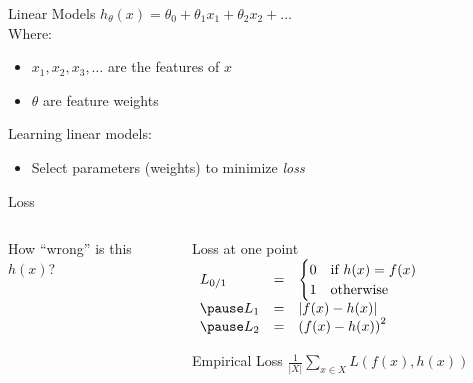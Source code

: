 \documentclass[14pt]{beamer}
\begin{document}
\begin{frame}[label=linear-models]{Linear Models}{}
{\Large$h_{\theta}(x) = \theta_0 + \theta_1 x_1 + \theta_2 x_2 + \ldots$}\\[1em]
Where:
\begin{itemize}
\item $x_1, x_2, x_3, \ldots$ are the features of $x$
\item $\theta$ are feature weights
\end{itemize}
\pause
\bigskip
Learning linear models:
\begin{itemize}
\item Select parameters (weights) to minimize \emph{loss}
\end{itemize}
\end{frame}

\begin{frame}[label=loss]{Loss}
\begin{columns}
\begin{column}{0.48\textwidth}
How ``wrong'' is this $h(x)$?\\[1em]
\end{column}
\pause
\begin{column}{0.48\textwidth}
\setlength{\arraycolsep}{0.1em}
\renewcommand{\arraystretch}{1.75}
\begin{block}{Loss at one point}
$\begin{array}{ l l l }
L_{0/1} & = &
\begin{cases}
0 & \text{if } h(x) = f(x) \\
1 & \text{otherwise}
\end{cases}
\\
\pause L_1 & = & \left| f(x) - h(x) \right| \\
\pause L_2 & = & \left( f(x) - h(x) \right)^2
\end{array}$
\end{block}
\pause
\begin{block}{Empirical Loss}
$\displaystyle\frac{1}{|X|} \sum_{x \in X} L(f(x), h(x))$
\end{block}
\end{column}
\end{columns}
\end{frame}
\end{document}

